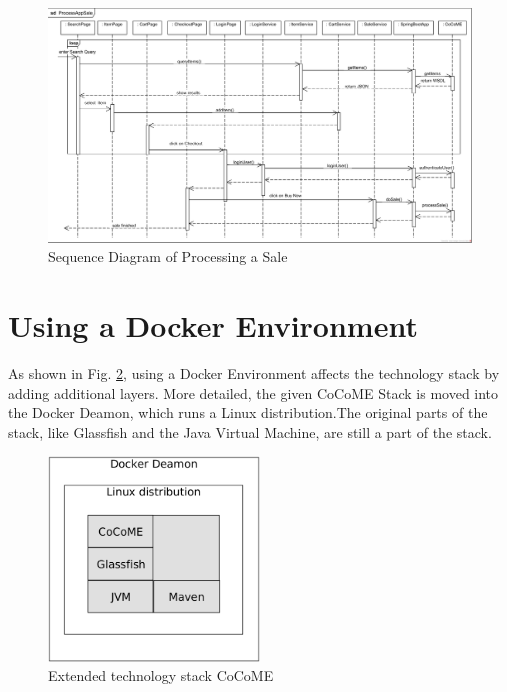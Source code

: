 \begin{figure}[!h]
	\includegraphics[width=\textwidth]{img/ProcessAppSale.png}
	\caption{Sequence Diagram of Processing a Sale}
	\label{SequenceAppSale}
\end{figure}

\newpage

\section{Using a Docker Environment} \label{Docker}

As shown in Fig. \ref{techStack}, using a Docker Environment affects the technology stack by adding additional layers. More detailed, the given CoCoME Stack is moved into the Docker Deamon, which runs a Linux distribution.The original parts of the stack, like Glassfish and the Java Virtual Machine, are still a part of the stack.
	
	\begin{figure}[!h]
		\centering
		\includegraphics[width = 0.5\textwidth]{img/tech_stack_CoCoME.png}
		\caption{Extended technology stack CoCoME}
		\label{techStack}
	\end{figure}
	
